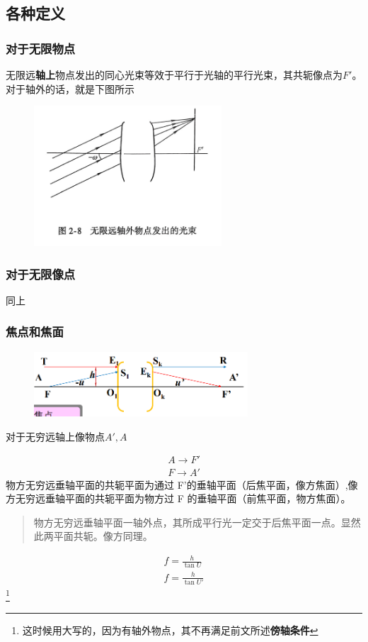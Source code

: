 \subsection{各种定义}

\subsubsection{对于无限物点}
无限远\textbf{轴上}物点发出的同心光束等效于平行于光轴的平行光束，其共轭像点为$F'$。对于轴外的话，就是下图所示
        \begin{figure}[H]
            \centering
            \includegraphics[width=7cm]{img/3.10.png}
            \end{figure}
\subsubsection{对于无限像点}
同上
\subsubsection{焦点和焦面}
        \begin{figure}[H]
            \centering
            \includegraphics[width=8cm]{img/1.11.png}
            \end{figure}
            对于无穷远轴上像物点$A',A$

            \begin{align}
        A \to F' \tag{3.2.1.a} \\
        F \to A' \tag{3.2.1.b} 
    \end{align}
    物方无穷远垂轴平面的共轭平面为通过 F’的垂轴平面（后焦平面，像方焦面）,像方无穷远垂轴平面的共轭平面为物方过 F 的垂轴平面（前焦平面，物方焦面）。
\begin{quote}
{\ccwd\kaishu{}
物方无穷远垂轴平面一轴外点，其所成平行光一定交于后焦平面一点。显然此两平面共轭。像方同理。
}
\end{quote}
\begin{align}
f=\frac{h}{\tan U} \tag{3.2.2.a}\\
f=\frac{h}{\tan U'} \tag{3.2.2.b}
\end{align}
\footnote[1]{这时候用大写的，因为有轴外物点，其不再满足前文所述\textbf{傍轴条件}}
